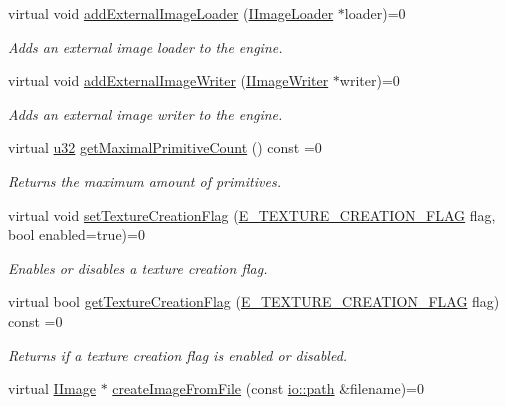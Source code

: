 \begin{DoxyCompactItemize}
virtual void \hyperlink{classirr_1_1video_1_1IVideoDriver_a9479ae15f0e26eaaf15c9420ff289b6d}{add\+External\+Image\+Loader} (\hyperlink{classirr_1_1video_1_1IImageLoader}{I\+Image\+Loader} $\ast$loader)=0
\begin{DoxyCompactList}\small\item\em Adds an external image loader to the engine. \end{DoxyCompactList}\item 
virtual void \hyperlink{classirr_1_1video_1_1IVideoDriver_a56160e0d88346e04db921fbe4635a7ae}{add\+External\+Image\+Writer} (\hyperlink{classirr_1_1video_1_1IImageWriter}{I\+Image\+Writer} $\ast$writer)=0
\begin{DoxyCompactList}\small\item\em Adds an external image writer to the engine. \end{DoxyCompactList}\item 
virtual \hyperlink{namespaceirr_a0416a53257075833e7002efd0a18e804}{u32} \hyperlink{classirr_1_1video_1_1IVideoDriver_afd93e778fac79f7863da72a50e720f88}{get\+Maximal\+Primitive\+Count} () const =0
\begin{DoxyCompactList}\small\item\em Returns the maximum amount of primitives. \end{DoxyCompactList}\item 
virtual void \hyperlink{classirr_1_1video_1_1IVideoDriver_a868b58a6b86b9e4841ca3879ce246c4e}{set\+Texture\+Creation\+Flag} (\hyperlink{namespaceirr_1_1video_acaf6f7414534f7d62bff18c5bf11876f}{E\+\_\+\+T\+E\+X\+T\+U\+R\+E\+\_\+\+C\+R\+E\+A\+T\+I\+O\+N\+\_\+\+F\+L\+AG} flag, bool enabled=true)=0
\begin{DoxyCompactList}\small\item\em Enables or disables a texture creation flag. \end{DoxyCompactList}\item 
virtual bool \hyperlink{classirr_1_1video_1_1IVideoDriver_ae64d474cbca38f64f2dbb8fcacb1a035}{get\+Texture\+Creation\+Flag} (\hyperlink{namespaceirr_1_1video_acaf6f7414534f7d62bff18c5bf11876f}{E\+\_\+\+T\+E\+X\+T\+U\+R\+E\+\_\+\+C\+R\+E\+A\+T\+I\+O\+N\+\_\+\+F\+L\+AG} flag) const =0
\begin{DoxyCompactList}\small\item\em Returns if a texture creation flag is enabled or disabled. \end{DoxyCompactList}\item 
virtual \hyperlink{classirr_1_1video_1_1IImage}{I\+Image} $\ast$ \hyperlink{classirr_1_1video_1_1IVideoDriver_ac5b4c13f64d96d27fa27f52b68f77b8c}{create\+Image\+From\+File} (const \hyperlink{namespaceirr_1_1io_a6468281622ce3a1c46b72e19f32dded5}{io\+::path} \&filename)=0

\end{DoxyCompactItemize}
